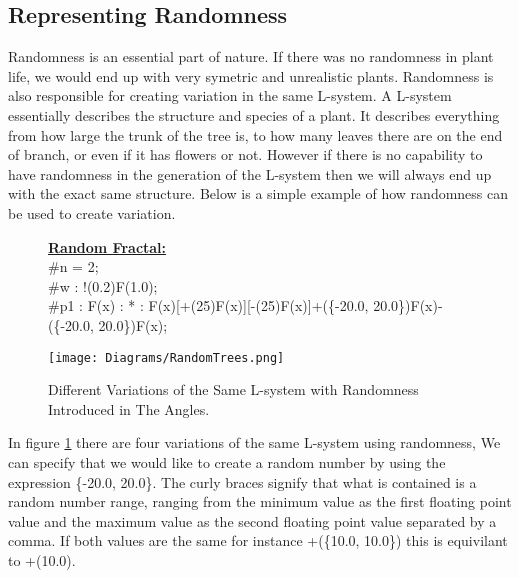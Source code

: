 \subsection{Representing Randomness}
\begin{flushleft}

Randomness is an essential part of nature. If there was no randomness in plant life, we would end up with very symetric and unrealistic plants. Randomness is also responsible for creating variation in the same L-system. A L-system essentially describes the structure and species of a plant. It describes everything from how large the trunk of the tree is, to how many leaves there are on the end of branch, or even if it has flowers or not. However if there is no capability to have randomness in the generation of the L-system then we will always end up with the exact same structure. 
\vspace{5mm}
Below is a simple example of how randomness can be used to create variation.

\end{flushleft}   

\begin{figure}[htbp]
	\raggedright
	\textbf{\underline{Random Fractal:}} \\
	\#n = 2; \\
	\#w : !(0.2)F(1.0); \\
	\#p1 : F(x) : * : F(x)[+(25)F(x)][-(25)F(x)]+(\{-20.0, 20.0\})F(x)-(\{-20.0, 20.0\})F(x);\\
	\vspace{10mm}
	{\centering
		\vspace{7px}
		\texttt{[image: Diagrams/RandomTrees.png]}
		\caption{Different Variations of the Same L-system with Randomness Introduced in The Angles. \label{figRandomness}}
	}
\end{figure}
\FloatBarrier

\begin{flushleft}

In figure \ref{figRandomness} there are four variations of the same L-system using randomness, We can specify that we would like to create a random number by using the expression \{-20.0, 20.0\}. The curly braces signify that what is contained is a random number range, ranging from the minimum value as the first floating point value and the maximum value as the second floating point value separated by a comma. If both values are the same for instance +(\{10.0, 10.0\}) this is equivilant to +(10.0).

\end{flushleft}

